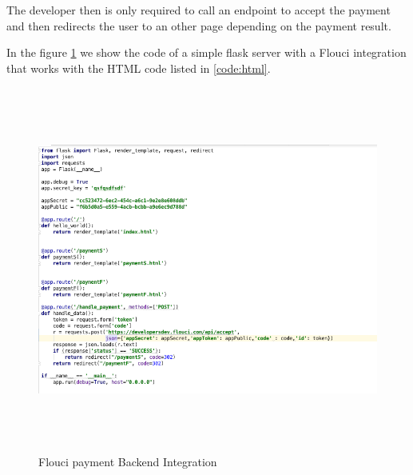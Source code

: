 \begin{spacing}{1.2}
The developer then is only required to call an endpoint to accept the payment and then redirects the user to an other page depending on the payment result.

In the figure \ref{fig:flask} we show the code of a simple flask server with a Flouci integration that works with the HTML code listed in \ref{code:html}.
\begin{figure}[H]\centering
\includegraphics[width=\textwidth,height=12cm]{flask.png}
\caption{Flouci payment Backend Integration}
\label{fig:flask}
\end{figure}

\end{spacing}
